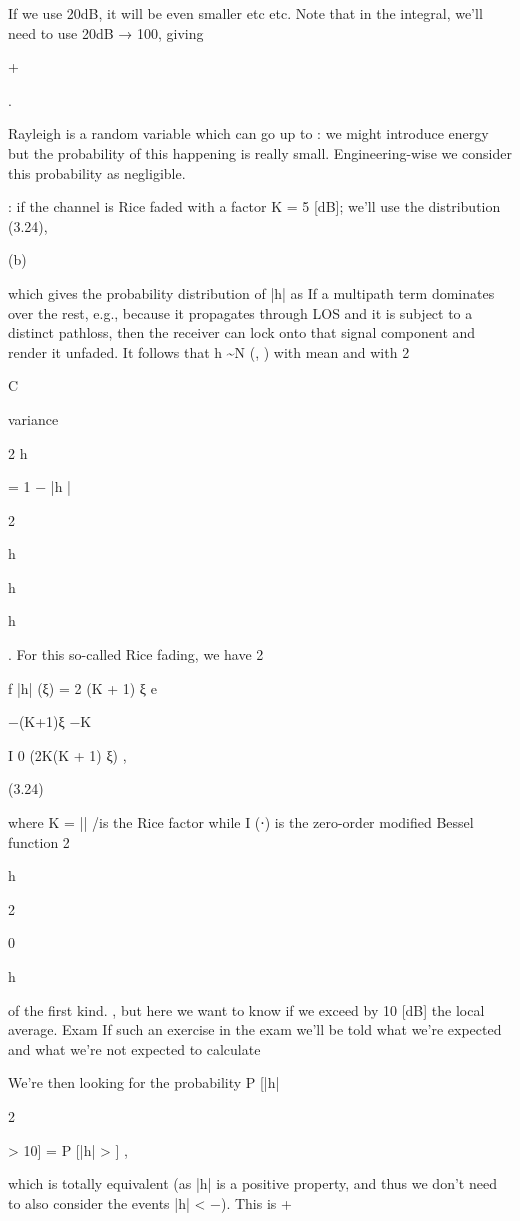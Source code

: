 {{{{If we use 20dB, it will be even smaller etc etc.
Note that in the integral, we'll need to use 20dB → 100, giving \int

+

.

Rayleigh is a random variable which can go up to \infty: we might introduce energy but the probability of this happening is really small. Engineering-wise we consider this probability as negligible.

: if the channel is Rice faded with a factor K = 5 [dB]; we'll use the distribution (3.24),

(b)

which gives the probability distribution of |h| as If a multipath term dominates over the rest, e.g., because it propagates through LOS and it is subject to a distinct pathloss, then the receiver can lock onto that signal component and render it unfaded. It follows that h \sim N (\mu , \sigma ) with mean \mu {} and with 2

C

variance \sigma

2 h

= 1 − |\mu h |

2

h

h

h

. For this so-called Rice fading, we have 2

f |h| (ξ) = 2 (K + 1) ξ e

−(K+1)ξ −K

I 0 (2\sqrt K(K + 1) ξ) ,

(3.24)

where K = |\mu | /\sigma is the Rice factor while I (⋅) is the zero-order modified Bessel function 2

h

2

0

h

of the first kind.
, but here we want to know if we exceed by 10 [dB] the local average.
Exam If such an exercise in the exam we'll be told what we're expected and what we're not expected to calculate

We're then looking for the probability P [|h|

2

> 10] = P [|h| > ] ,

which is totally equivalent (as |h| is a positive property, and thus we don't need to also consider the events |h| < −). This is
+\infty

}}}}
